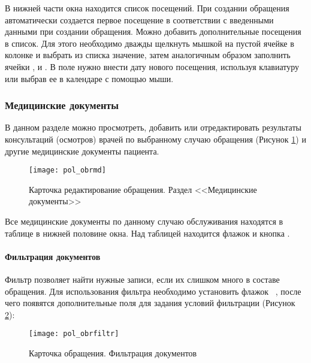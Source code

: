 В нижней части окна находится список посещений. При создании обращения автоматически создается первое посещение в соответствии с введенными данными при создании обращения. Можно добавить дополнительные посещения в список. Для этого необходимо дважды щелкнуть мышкой на пустой ячейке в колонке  и выбрать из списка значение, затем аналогичным образом заполнить ячейки ,  и . В поле  нужно внести дату нового посещения, используя клавиатуру или выбрав ее в календаре с помощью мыши.

\subsubsection{Медицинские документы} \label{pol_obr_md}

В данном разделе можно просмотреть, добавить или отредактировать результаты консультаций (осмотров) врачей по выбранному случаю обращения (Рисунок \ref{img_pol_obrmd}) и другие медицинские документы пациента.

\begin{figure}[ht]\centering
 \texttt{[image: pol\_obrmd]}
 \caption{Карточка редактирование обращения. Раздел <<Медицинские документы>>}
 \label{img_pol_obrmd}
\end{figure}

Все медицинские документы по данному случаю обслуживания находятся в таблице в нижней половине окна. Над таблицей находится флажок  и кнопка .

\paragraph{Фильтрация документов} \label{pol_obr_mdfiltr}

Фильтр позволяет найти нужные записи, если их слишком много в составе обращения. Для использования фильтра необходимо установить флажок \putx~, после чего появятся дополнительные поля для задания условий фильтрации (Рисунок \ref{img_pol_obrfiltr}):

\begin{figure}[ht]\centering
 \texttt{[image: pol\_obrfiltr]}
 \caption{Карточка обращения. Фильтрация документов}
 \label{img_pol_obrfiltr}
\end{figure}

